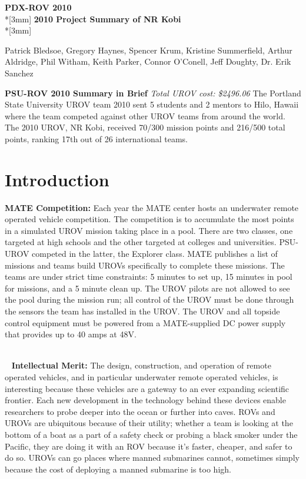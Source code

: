 \documentclass{proposalnsf}
\begin{document}
\begin{center}
{\Large{\bf PDX-ROV 2010}}\\*[3mm]
{\bf 2010 Project Summary of NR Kobi} \\*[3mm]

Patrick Bledsoe, Gregory Haynes, Spencer Krum, Kristine Summerfield, Arthur Aldridge, Phil Witham, Keith Parker, Connor O'Conell, Jeff Doughty, Dr. Erik Sanchez

\end{center}

\noindent
{\bf PSU-ROV 2010 Summary in Brief}
{\it Total UROV cost: \$2496.06}
The Portland State University UROV team 2010 sent 5 students and 2 mentors to Hilo, Hawaii where the team competed against other UROV teams from around the world. The 2010 UROV, NR Kobi, received 70/300 mission points and 216/500 total points, 
ranking 17th out of 26 international teams.


\section{Introduction}
\noindent
{\bf MATE Competition:}
Each year the MATE center hosts an underwater remote operated vehicle competition. The competition is to accumulate the most points
in a simulated UROV mission taking place in a pool. There are two classes, one targeted at high schools and 
the other targeted at colleges and universities. PSU-UROV competed in the latter, the Explorer class. MATE 
publishes a list of missions and teams build UROVs specifically to complete these missions. The teams are under strict
 time constraints: 5 minutes to set up, 15 minutes in pool for missions, and a 5 minute clean up. The UROV pilots are not allowed to see the pool during the mission run; all 
control of the UROV must be done through the sensors the team has installed in the UROV. The UROV and all topside control equipment must be 
powered from a MATE-supplied DC power supply that provides up to 40 amps at 48V.

\ \\\ 
\noindent
{\bf Intellectual Merit:}
The design, construction, and operation of remote operated vehicles, and in particular underwater remote operated vehicles, is interesting
because these vehicles are a gateway to an ever expanding scientific frontier. Each new development in the technology behind these devices enable 
researchers to probe deeper into the ocean or further into caves. ROVs and UROVs are ubiquitous because 
of their utility; whether a team is looking at the bottom of a boat as a part of a safety check or probing a black smoker under the Pacific, 
they are doing it with an ROV because it's faster, cheaper, and safer to do so. UROVs can go places where manned submarines cannot, sometimes 
simply because the cost of deploying a manned submarine is too high.  
\ \\
\end{document}
